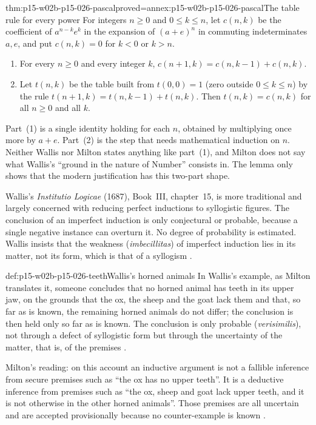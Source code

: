 \begin{hblemma}{thm:p15-w02b-p15-026-pascal}{proved=annex:p15-w02b-p15-026-pascal}{The table rule for every power}
For integers $n\geq 0$ and $0\leq k\leq n$, let $c(n,k)$ be the coefficient
of $a^{n-k}e^k$ in the expansion of $(a+e)^n$ in commuting indeterminates
$a,e$, and put $c(n,k)=0$ for $k<0$ or $k>n$.
\begin{enumerate}
\item For every $n\geq 0$ and every integer $k$,
  $c(n+1,k)=c(n,k-1)+c(n,k)$.
\item Let $t(n,k)$ be the table built from $t(0,0)=1$ (zero outside
  $0\leq k\leq n$) by the rule $t(n+1,k)=t(n,k-1)+t(n,k)$. Then
  $t(n,k)=c(n,k)$ for all $n\geq 0$ and all $k$.
\end{enumerate}
\end{hblemma}

Part~(1) is a single identity holding for each $n$, obtained by
multiplying once more by $a+e$. Part~(2) is the step that needs
mathematical induction on $n$. Neither Wallis nor Milton states
anything like part~(1), and Milton does not say what Wallis's ``ground in
the nature of Number'' consists in. The lemma only shows that the modern
justification has this two-part shape.

Wallis's \emph{Institutio Logicae} (1687), Book~III, chapter~15, is more
traditional and largely concerned with reducing perfect inductions to
syllogistic figures. The conclusion of an imperfect induction is only
conjectural or probable, because a single negative instance can overturn
it. No degree of probability is estimated. Wallis insists that the
weakness (\emph{imbecillitas}) of imperfect induction lies in its matter,
not its form, which is that of a syllogism
\cite[p.~33]{Milton2011InductionBeforeHume}.

\begin{hbexample}{def:p15-w02b-p15-026-teeth}{Wallis's horned animals}
In Wallis's example, as Milton translates it, someone concludes that no
horned animal has teeth in its upper jaw, on the grounds that the ox, the
sheep and the goat lack them and that, so far as is known, the remaining
horned animals do not differ; the conclusion is then held only so far as
is known. The conclusion is only probable
(\emph{verisimilis}), not through a defect of syllogistic form but through
the uncertainty of the matter, that is, of the premises
\cite[p.~33]{Milton2011InductionBeforeHume}.

Milton's reading: on this account an inductive argument is not a fallible
inference from secure premises such as ``the ox has no upper teeth''. It is
a deductive inference from premises such as ``the ox, sheep and goat lack
upper teeth, and it is not otherwise in the other horned animals''. Those
premises are all uncertain and are accepted provisionally because no
counter-example is known \cite[p.~33]{Milton2011InductionBeforeHume}.
\end{hbexample}

